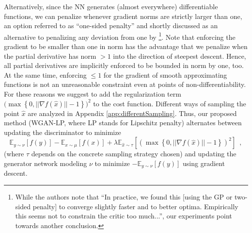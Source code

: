 \documentclass{article} %
\newcommand{\af}[1]{\textcolor{blue}{#1}}
\begin{document}
Alternatively, since the NN generates (almost everywhere) differentiable functions, we can penalize whenever gradient norms are strictly larger than one, an option referred to as ``one-sided penalty'' and shortly discussed as an alternative to penalizing any deviation from one by \citet{iWGAN}\footnote{While the authors note that ``In practice, we found this [using the GP or two-sided penalty] to converge slightly faster and to better optima. Empirically this seems not to constrain the critic too much...'', our experiments point towards another conclusion.}.
Note that enforcing the gradient to be smaller than one in norm has the advantage that we penalize when the partial derivative has norm $> 1$ into the direction of steepest descent. Hence, all partial derivatives are implicitly enforced to be bounded in norm by one, too. At the same time, enforcing $\leq 1$ for the gradient of smooth approximating functions is not an unreasonable constraint even at points of non-differentiability. For these reasons we suggest 
to add the regularization term
$\big(\max \left \{ 0 , ||\nabla f (\hat x)|| -1 \right \}\big)^2$
to the cost function. Different ways of sampling the point $\hat x$ are analyzed in Appendix
\ref{app:differentSampling}.
%
%
Thus, our proposed method (WGAN-LP, where LP stands for Lipschitz penalty) alternates between updating the discriminator to minimize
\begin{equation}\label{eq:WGAN-LP}
  \mathbb{E}_{y\sim \nu}[f(y)]  -\mathbb{E}_{x\sim \mu}[f(x)]+ \lambda \mathbb{E}_{\hat x \sim \tau}[\left( \max \left \{ 0 , ||\nabla f (\hat x)|| -1 \right \} \right)^2] \enspace,
\end{equation}
(where $\tau$ depends on the concrete sampling strategy chosen)
and updating the generator network modeling $\nu$ to minimize $-\mathbb{E}_{y\sim \nu}[f(y)]$ using gradient descent.
\end{document}

